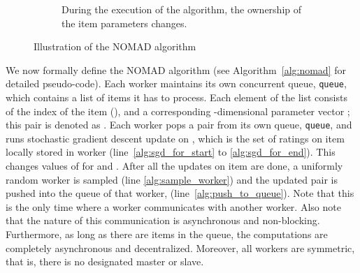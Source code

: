 \documentclass{vldb}
\begin{document}
\begin{figure}[htbp]
\begin{subfigure}[t]{0.22\textwidth}
    \caption{During the execution of the algorithm, the ownership of the
      item parameters  changes.}
  \end{subfigure}
  \caption{Illustration of the NOMAD algorithm}
  \label{fig:nomad_scheme}
\end{figure}

We now formally define the NOMAD algorithm (see
Algorithm~\ref{alg:nomad} for detailed pseudo-code).  Each worker 
maintains its own concurrent queue, \texttt{queue}, which
contains a list of items it has to process.  Each element of the list
consists of the index of the item  (), and a
corresponding -dimensional parameter vector ; this pair is
denoted as .  Each worker  pops a  pair
from its own queue, \texttt{queue}, and runs stochastic gradient
descent update on , which is the set of ratings on
item  locally stored in worker  (line~\ref{alg:sgd_for_start} to
\ref{alg:sgd_for_end}).  This changes values of  for  and .  After all the updates on item  are done, a
uniformly random worker  is sampled (line \ref{alg:sample_worker})
and the updated  pair is pushed into the queue of that
worker,  (line~\ref{alg:push_to_queue}).  Note that this is the
only time where a worker communicates with another worker. Also note
that the nature of this communication is asynchronous and
non-blocking. Furthermore, as long as there are items in the queue,
the computations are completely asynchronous and
decentralized. Moreover, all workers are symmetric, that is, there is
no designated master or slave.
\end{document}
